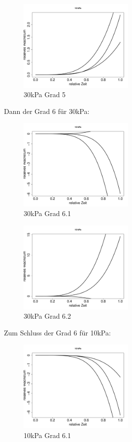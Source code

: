\documentclass[12pt,a4paper]{article}
\theoremstyle{definition}
\theoremstyle{definition}
\theoremstyle{definition}
\theoremstyle{definition}
\begin{document}
\begin{figure}[H] 
  \centering
     \includegraphics[width=0.5\textwidth]{30kPa-Grad-5-KB}
  \caption{30kPa Grad 5}
  \label{30kPa Grad 5}
\end{figure}

Dann der Grad 6 für 30kPa:

\begin{figure}[H] 
  \centering
     \includegraphics[width=0.5\textwidth]{30kPa-Grad-6-1-KB}
  \caption{30kPa Grad 6.1}
  \label{30kPa Grad 6.1}
\end{figure}

\begin{figure}[H] 
  \centering
     \includegraphics[width=0.5\textwidth]{30kPa-Grad-6-2-KB}
  \caption{30kPa Grad 6.2}
  \label{30kPa Grad 6.2}
\end{figure}

Zum Schluss der Grad 6 für 10kPa:

\begin{figure}[H] 
  \centering
     \includegraphics[width=0.5\textwidth]{10kPa-Grad-6-1-KB}
  \caption{10kPa Grad 6.1}
  \label{10kPa Grad 6.1}
\end{figure}
\end{document}
